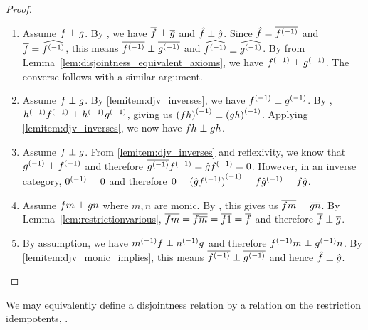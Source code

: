 \begin{proof}
  \prepprooflist
  \begin{enumerate}[{(}i{)}]
    \item Assume $f \perp g$. By , we have $\overline{f} \perp \overline{g}$ and
      $\hat{f}\perp\hat{g}$. Since $\hat{f} = \overline{{f}^{(-1)}}$ and $\overline{f} = \widehat{{f}^{(-1)}}$, this
      means $\overline{{f}^{(-1)}} \perp \overline{{g}^{(-1)}}$ and $\widehat{{f}^{(-1)}}\perp\widehat{{g}^{(-1)}}$. By
       from Lemma~\ref{lem:disjointness_equivalent_axioms}, we have
      ${f}^{(-1)} \perp {g}^{(-1)}$. The converse follows with  a similar argument.
    \item Assume $f \perp g$. By \ref{lemitem:djv_inverses}, we have ${f}^{(-1)}\perp{g}^{(-1)}$. By
      , ${h}^{(-1)}{f}^{(-1)}\perp{h}^{(-1)}{g}^{(-1)}$, giving us ${(f h)}^{(-1)} \perp
      {(g h)}^{(-1)}$. Applying \ref{lemitem:djv_inverses}, we now have $f h \perp g h$.
    \item Assume $f \perp g$. From \ref{lemitem:djv_inverses} and reflexivity, we know that
      ${g}^{(-1)} \perp {f}^{(-1)}$ and therefore $\overline{{g}^{(-1)}}{f}^{(-1)} = \hat{g}{f}^{(-1)}= 0$. However, in
      an inverse category, ${0}^{(-1)} = 0$ and therefore $0 = {(\hat{g}{f}^{(-1)})}^{(-1)} = f {\hat{g}}^{(-1)} =
      f \hat{g}$.
    \item Assume $f m \perp g n$ where $m, n$ are monic. By , this gives us
      $\overline{f m} \perp \overline{g n}$. By Lemma~\ref{lem:restrictionvarious},
      $\overline{f m} = \overline{f \overline{m}} = \overline{f 1} = \overline{f}$ and therefore $\overline{f} \perp \overline{g}$.
    \item By assumption, we have ${m}^{(-1)} f \perp  {n}^{(-1)}g$ and therefore ${f}^{(-1)}m \perp
      {g}^{(-1)} n$. By \ref{lemitem:djv_monic_implies}, this means $\overline{{f}^{(-1)}} \perp
      \overline{{g}^{(-1)}}$ and hence $\hat{f} \perp \hat{g}$.
  \end{enumerate}
\end{proof}

We may equivalently define a disjointness relation by a relation on the restriction idempotents, .


